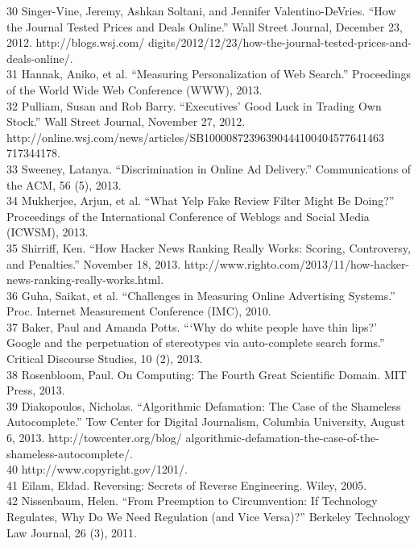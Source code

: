 30 Singer-Vine, Jeremy, Ashkan Soltani, and Jennifer Valentino-DeVries. ``How the Journal Tested Prices and Deals Online.'' Wall Street Journal, December 23, 2012. http://blogs.wsj.com/ digits/2012/12/23/how-the-journal-tested-prices-and-deals-online/. \\
31 Hannak, Aniko, et al. ``Measuring Personalization of Web Search.'' Proceedings of the World Wide Web Conference (WWW), 2013. \\
32 Pulliam, Susan and Rob Barry. ``Executives' Good Luck in Trading Own Stock.'' Wall Street Journal, November 27, 2012. http://online.wsj.com/news/articles/SB10000872396390444100404577641463 717344178. \\
33 Sweeney, Latanya. ``Discrimination in Online Ad Delivery.'' Communications of the ACM, 56 (5), 2013. \\
34 Mukherjee, Arjun, et al. ``What Yelp Fake Review Filter Might Be Doing?'' Proceedings of the International Conference of Weblogs and Social Media (ICWSM), 2013. \\
35 Shirriff, Ken. ``How Hacker News Ranking Really Works: Scoring, Controversy, and Penalties.'' November 18, 2013. http://www.righto.com/2013/11/how-hacker-news-ranking-really-works.html. \\
36 Guha, Saikat, et al. ``Challenges in Measuring Online Advertising Systems.'' Proc. Internet Measurement Conference (IMC), 2010. \\
37 Baker, Paul and Amanda Potts. ``‘Why do white people have thin lips?' Google and the perpetuation of stereotypes via auto-complete search forms.'' Critical Discourse Studies, 10 (2), 2013. \\
38 Rosenbloom, Paul. On Computing: The Fourth Great Scientific Domain. MIT Press, 2013. \\
39 Diakopoulos, Nicholas. ``Algorithmic Defamation: The Case of the Shameless Autocomplete.'' Tow Center for Digital Journalism, Columbia University, August 6, 2013. http://towcenter.org/blog/ algorithmic-defamation-the-case-of-the-shameless-autocomplete/. \\
40 http://www.copyright.gov/1201/. \\
41 Eilam, Eldad. Reversing: Secrets of Reverse Engineering. Wiley, 2005. \\
42 Nissenbaum, Helen. ``From Preemption to Circumvention: If Technology Regulates, Why Do We Need Regulation (and Vice Versa)?'' Berkeley Technology Law Journal, 26 (3), 2011. \\

